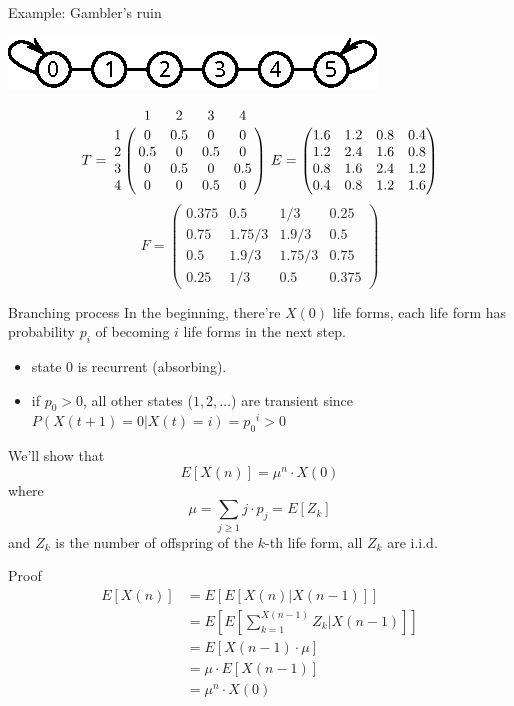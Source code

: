 \documentclass[mathserif]{beamer}
\begin{document}
\begin{frame}{Example: Gambler's ruin}
\begin{center}
\includegraphics[scale=1.5]{gambler_line}
\end{center}
\[
T = \bordermatrix{~ & 1   & 2   & 3   & 4 \cr
                  1 & 0   & 0.5 & 0   & 0 \cr
                  2 & 0.5 & 0   & 0.5 & 0 \cr
                  3 & 0   & 0.5 & 0   & 0.5 \cr
                  4 & 0   & 0   & 0.5 & 0 \cr}
~E = \begin{pmatrix}
1.6 & 1.2 & 0.8 & 0.4 \\
1.2 & 2.4 & 1.6 & 0.8 \\
0.8 & 1.6 & 2.4 & 1.2 \\
0.4 & 0.8 & 1.2 & 1.6
\end{pmatrix}
\]
\[
F = \begin{pmatrix}
0.375 & 0.5 & 1/3 & 0.25 \\
0.75 & 1.75/3 & 1.9/3 & 0.5 \\
0.5 & 1.9/3 & 1.75/3 & 0.75 \\
0.25 & 1/3 & 0.5 & 0.375
\end{pmatrix}
\]
\end{frame}

\begin{frame}{Branching process}
In the beginning, there're $X(0)$ life forms, 
each life form has probability $p_i$ of becoming $i$ life forms in the next step.
\begin{itemize}
\item state 0 is recurrent (absorbing).
\item if $p_0 > 0$, all other states ($1,2,\ldots$) are transient since\\
	$P(X(t+1)=0|X(t)=i) = {p_0}^i > 0$
\end{itemize}
We'll show that
\[
E[X(n)] = \mu^n \cdot X(0)
\]
where
\[
\mu = \sum_{j \geq 1} j \cdot p_j = E[Z_k]
\]
and $Z_k$ is the number of offspring of the $k$-th life form, all $Z_k$ are i.i.d.
\end{frame}

\begin{frame}{Proof}
\begin{align*}
E[X(n)] & = E[E[X(n)|X(n-1)]] \\
& = E\left[E\left[\sum_{k=1}^{X(n-1)} Z_k | X(n-1)\right]\right] \\
& = E[X(n-1) \cdot \mu] \\
& = \mu \cdot E[X(n-1)] \\
& = \mu^n \cdot X(0)
\end{align*}
\end{frame}
\end{document}
